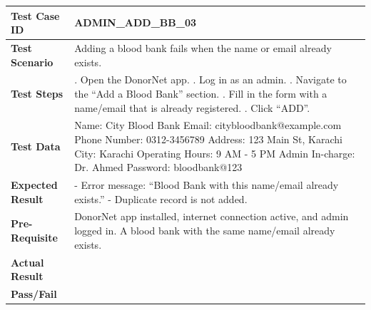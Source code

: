 \documentclass[11pt]{article}
\begin{document}
\noindent
\begin{tabularx}{\textwidth}{|>{\raggedright\arraybackslash}p{}|>{\raggedright\arraybackslash}X|}
\hline
\textbf{Test Case ID} & ADMIN\_ADD\_BB\_03 \\
\hline
\textbf{Test Scenario} & Adding a blood bank fails when the name or email already exists. \\
\hline
\textbf{Test Steps} & 1. Open the DonorNet app. \newline
2. Log in as an admin. \newline
3. Navigate to the ``Add a Blood Bank'' section. \newline
4. Fill in the form with a name/email that is already registered. \newline
5. Click ``ADD''. \\
\hline
\textbf{Test Data} & Name: City Blood Bank \newline
Email: citybloodbank@example.com \newline
Phone Number: 0312-3456789 \newline
Address: 123 Main St, Karachi \newline
City: Karachi \newline
Operating Hours: 9 AM - 5 PM \newline
Admin In-charge: Dr. Ahmed \newline
Password: bloodbank@123 \\
\hline
\textbf{Expected Result} & - Error message: ``Blood Bank with this name/email already exists.'' \newline
- Duplicate record is not added. \\
\hline
\textbf{Pre-Requisite} & DonorNet app installed, internet connection active, and admin logged in. A blood bank with the same name/email already exists. \\
\hline
\textbf{Actual Result} &  \\
\hline
\textbf{Pass/Fail} &  \\
\hline
\end{tabularx}
\vspace{1em}
\end{document}
